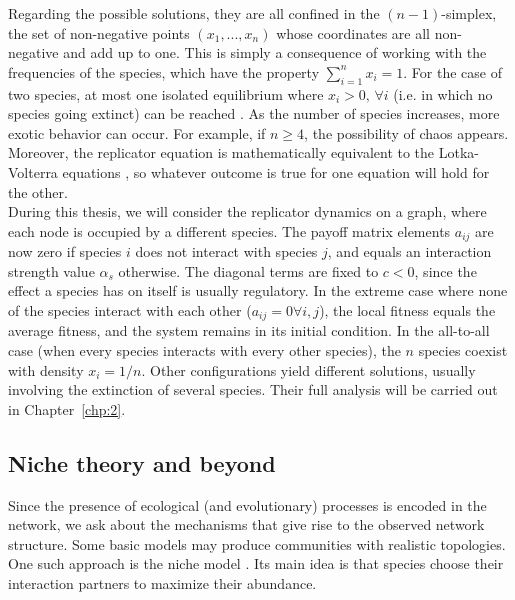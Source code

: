  Regarding the possible solutions, they are all confined in the $(n-1)$-simplex, the set of non-negative points $(x_1, ..., x_n)$ whose coordinates are all non-negative and add up to one. This is simply a consequence
 of working with the frequencies of the species, which have the property $\sum^n_{i = 1} x_i = 1$.
For the case of two species, at most one isolated equilibrium where $x_i > 0, \, \forall i$ (i.e. in which no species going extinct) can be reached \cite{Nowak2006EvolutionaryDynamics}. As the number of species increases, more exotic behavior can occur. For example, if $n \geq 4$, the possibility of chaos appears. Moreover, the replicator equation is mathematically equivalent to the Lotka-Volterra equations \cite[Chapter~7]{houfbauer1998book}, so whatever outcome is true for one equation will hold for the other\cite{page2002unifying}.\\
 
During this thesis, we will consider the replicator dynamics on a graph, where each node is occupied by a different species. The payoff matrix elements $a_{ij}$ are now zero if species $i$ does not interact with species $j$, and  equals an interaction strength value $\alpha_s$  otherwise. The diagonal terms are fixed to $c < 0$, since the effect a species has on itself is usually regulatory. In the extreme case where none of the species interact with each other ($a_{ij} = 0 \forall i,j$), the local fitness equals the average fitness, and the system remains in its initial condition. In the all-to-all case (when every species interacts with every other species), the $n$ species coexist with density $x_i = 1/n$. Other configurations yield different solutions, usually involving the extinction of several species. Their full analysis will be carried out in Chapter~\ref{chp:2}.
\subsection{Niche theory and beyond}\label{chp:methods:niche}
Since the presence of ecological (and evolutionary) processes is encoded in the network, we ask about the mechanisms that give rise to the observed network structure. Some basic models may produce communities with realistic topologies. One such approach is the niche model \cite{cai2021niches}. Its main idea is that species choose their interaction partners to maximize their abundance.\\

